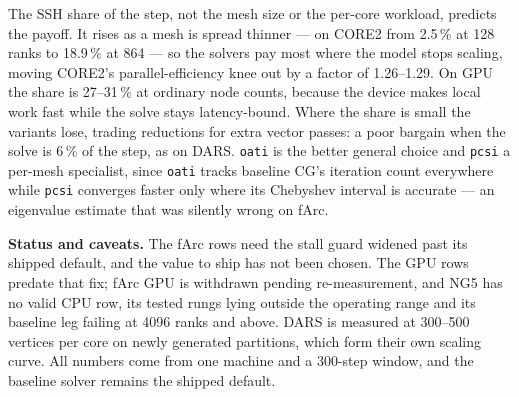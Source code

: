 \documentclass[10pt,a4paper]{article}
\begin{document}
The SSH share of the step, not the mesh size or the per-core workload, predicts the payoff. It
rises as a mesh is spread thinner --- on CORE2 from 2.5\,\% at 128 ranks to 18.9\,\% at 864
--- so the solvers pay most where the model stops scaling, moving CORE2's parallel-efficiency
knee out by a factor of 1.26--1.29. On GPU the share is 27--31\,\% at ordinary node counts,
because the device makes local work fast while the solve stays latency-bound. Where the share
is small the variants lose, trading reductions for extra vector passes: a poor bargain when
the solve is 6\,\% of the step, as on DARS. \texttt{oati} is the better general choice and
\texttt{pcsi} a per-mesh specialist, since \texttt{oati} tracks baseline CG's iteration count
everywhere while \texttt{pcsi} converges faster only where its Chebyshev interval is accurate
--- an eigenvalue estimate that was silently wrong on fArc.

\textbf{Status and caveats.}
The fArc rows need the stall guard widened past its shipped default, and the value to ship has
not been chosen. The GPU rows predate that fix; fArc GPU is withdrawn pending re-measurement,
and NG5 has no valid CPU row, its tested rungs lying outside the operating range and its
baseline leg failing at 4096 ranks and above. DARS is measured at 300--500 vertices per core on newly
generated partitions, which form their own scaling curve. All numbers come from one machine
and a 300-step window, and the baseline solver remains the shipped default.
\end{document}
